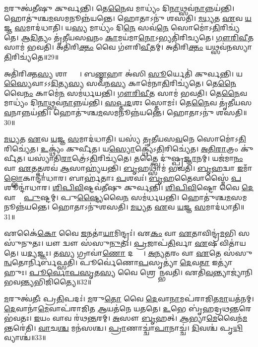 \ul{𑌮}𑌰𑍁𑌤𑍍𑌵॑𑌤𑍀𑌷𑍁 𑌕𑍁𑌰𑍍𑌵𑌨𑍍𑌤𑌿।
𑌤𑍇\ul{𑌨𑍈}𑌵 𑌮𑌾𑌧𑍍𑌯𑌂॑ 𑌦𑌿\ul{𑌨𑌾}𑌥𑍍𑌸𑌵॑\ul{𑌨𑌾}𑌨𑍍𑌨𑌯॑𑌨𑍍𑌤𑌿।
𑌹𑍋𑌤𑍁॑𑌶𑍍𑌚\ul{𑌮}𑌸𑌮𑌨𑍂𑌨𑍍𑌨॑𑌯𑌨𑍍𑌤𑍇।
𑌹𑍋𑌤𑌾𑌽𑌨𑍁॑ 𑌶𑌸𑌤𑌿।
\ul{𑌮}\ul{𑌧𑍍𑌯}𑌤 \ul{𑌏}𑌵 \ul{𑌯}𑌜𑍍𑌞 \ul{𑌸}𑌮𑌾𑌦॑𑌧𑌾𑌤𑌿।
𑌯\ul{𑌸𑍍𑌯} 𑌮𑌾𑌧𑍍𑌯𑌂॑ 𑌦𑌿\ul{𑌨𑍇} 𑌸𑌵॑\ul{𑌨𑍇} 𑌸𑍋𑌮𑍋॑\-𑌽\ul{𑌤𑌿}𑌰𑌿𑌚𑍍𑌯॑𑌤𑍇।
\ul{𑌆}\ul{𑌦𑌿}𑌤𑍍𑌯𑌂 𑌤𑍃॑𑌤𑍀𑌯𑌸\ul{𑌵}𑌨𑌂 \ul{𑌕𑌾}𑌮𑌯॑𑌮𑌾\ul{𑌨𑍋}\-𑌽𑌭𑍍𑌯𑌤𑌿॑𑌰𑌿𑌚𑍍𑌯𑌤𑍇।
\ul{𑌗𑍗}\ul{𑌰𑌿}\ul{𑌵𑍀}𑌤 𑌸𑌾𑌮॑ 𑌭𑌵𑌤𑌿।
𑌅𑌤𑌿॑𑌰𑌿\ul{𑌕𑍍𑌤𑌂} 𑌵𑍈 𑌗𑍗॑𑌰𑌿\ul{𑌵𑍀}𑌤𑌮𑍍।
𑌅𑌤𑌿॑𑌰𑌿\ul{𑌕𑍍𑌤𑌂} 𑌯𑌥𑍍𑌸𑌵॑𑌨𑌸𑍍𑌯𑌾\ul{𑌤𑌿}𑌰𑌿𑌚𑍍𑌯॑𑌤𑍇॥29॥

𑌅𑌤𑌿॑𑌰𑌿𑌕𑍍𑌤\ul{𑌸𑍍𑌯} 𑌶𑌾𑌨𑍍𑌤𑍍𑌯𑍈᳚।
𑌬\ul{𑌣𑍍𑌮}𑌹𑌾 𑌅॑𑌸𑌿 \ul{𑌸𑍂}𑌰𑍍𑌯𑍇𑌤𑌿॑ 𑌕𑍁𑌰𑍍𑌵𑌨𑍍𑌤𑌿।
𑌯\ul{𑌸𑍍𑌯𑍈}𑌵𑌾\-𑌽𑌽\ul{𑌦𑌿}𑌤𑍍𑌯\ul{𑌸𑍍𑌯} 𑌸𑌵॑𑌨\ul{𑌸𑍍𑌯} 𑌕𑌾𑌮𑍇॑𑌨𑌾\ul{𑌤𑌿}𑌰𑌿𑌚𑍍𑌯॑𑌤𑍇।
𑌤𑍇\ul{𑌨𑍈}𑌵𑍈\ul{𑌨𑌂} 𑌕𑌾𑌮𑍇॑\ul{𑌨} 𑌸𑌮॑𑌰𑍍𑌧𑌯𑌨𑍍𑌤𑌿।
\ul{𑌗𑍗}\ul{𑌰𑌿}\ul{𑌵𑍀}𑌤 𑌸𑌾𑌮॑ 𑌭𑌵𑌤𑌿।
𑌤𑍇\ul{𑌨𑍈}𑌵 𑌮𑌾𑌧𑍍𑌯𑌂॑ 𑌦𑌿\ul{𑌨𑌾}𑌥𑍍𑌸𑌵॑\ul{𑌨𑌾}𑌨𑍍𑌨𑌯॑𑌨𑍍𑌤𑌿।
\ul{𑌸}\ul{𑌪𑍍𑌤}\ul{𑌦}𑌶𑌃 𑌸𑍍𑌤𑍋𑌮𑌃॑।
𑌤𑍇\ul{𑌨𑍈}𑌵 𑌤𑍃॑𑌤𑍀𑌯𑌸\ul{𑌵}𑌨𑌾𑌨𑍍𑌨𑌯॑𑌨𑍍𑌤𑌿।
𑌹𑍋𑌤𑍁॑𑌶𑍍𑌚\ul{𑌮}𑌸𑌮𑌨𑍂𑌨𑍍𑌨॑𑌯𑌨𑍍𑌤𑍇।
𑌹𑍋𑌤𑌾𑌽𑌨𑍁॑ 𑌶𑌸𑌤𑌿॥30॥

\ul{𑌮}\ul{𑌧𑍍𑌯}𑌤 \ul{𑌏}𑌵 \ul{𑌯}𑌜𑍍𑌞 \ul{𑌸}𑌮𑌾𑌦॑𑌧𑌾𑌤𑌿।
𑌯𑌸𑍍𑌯॑ 𑌤𑍃𑌤𑍀𑌯𑌸\ul{𑌵}𑌨𑍇 𑌸𑍋𑌮𑍋॑\-𑌽\ul{𑌤𑌿}𑌰𑌿𑌚𑍍𑌯𑍇॑𑌤।
\ul{𑌉}𑌕𑍍𑌥𑍍𑌯𑌂॑ 𑌕𑍁𑌰𑍍𑌵𑍀𑌤।
𑌯\ul{𑌸𑍍𑌯𑍋}𑌕𑍍𑌥𑍍𑌯𑍇॑\-𑌽\ul{𑌤𑌿}𑌰𑌿𑌚𑍍𑌯𑍇॑𑌤।
\ul{𑌅}\ul{𑌤𑌿}\ul{𑌰𑌾}𑌤𑍍𑌰𑌂 𑌕𑍁॑𑌰𑍍𑌵𑍀𑌤।
𑌯𑌸𑍍𑌯𑌾॑𑌤𑌿\ul{𑌰𑌾}𑌤𑍍𑌰𑍇॑\-𑌽\ul{𑌤𑌿}𑌰𑌿𑌚𑍍𑌯॑𑌤𑍇।
𑌤𑌤𑍍𑌤𑍍𑌵𑍈 𑌦𑍁॑𑌷𑍍𑌪𑍍𑌰\ul{𑌜𑍍𑌞𑌾}𑌨𑌮𑍍।
𑌯𑌜॑𑌮𑌾\ul{𑌨𑌂} 𑌵𑌾 \ul{𑌏}𑌤\ul{𑌤𑍍𑌪}𑌶𑌵॑ \ul{𑌆}𑌸𑌾𑌹𑍍𑌯॑𑌯𑌨𑍍𑌤𑌿।
\ul{𑌬𑍃}𑌹𑌥𑍍𑌸𑌾𑌮॑ 𑌭𑌵𑌤𑌿।
\ul{𑌬𑍃}𑌹𑌦𑍍𑌵𑌾 \ul{𑌇}𑌮𑌾𑌁\ul{𑌲𑍍𑌲𑍋}𑌕𑌾𑌨𑍍𑌦𑌾॑𑌧𑌾𑌰।
𑌬𑌾𑌰𑍍\mbox{}𑌹॑𑌤𑌾𑌃 \ul{𑌪}𑌶𑌵𑌃॑।
\ul{𑌬𑍃}\ul{𑌹}𑌤𑍈𑌵𑌾𑌸𑍍𑌮𑍈॑ \ul{𑌪}𑌶𑍂𑌨𑍍𑌦𑌾॑𑌧𑌾𑌰।
\ul{𑌶𑌿}\ul{𑌪𑌿}\ul{𑌵𑌿}𑌷𑍍𑌟𑌵॑𑌤𑍀𑌷𑍁 𑌕𑍁𑌰𑍍𑌵𑌨𑍍𑌤𑌿।
\ul{𑌶𑌿}\ul{𑌪𑌿}\ul{𑌵𑌿}𑌷𑍍𑌟𑍋 𑌵𑍈 \ul{𑌦𑍇}𑌵𑌾𑌨𑌾𑌂᳚ \ul{𑌪𑍁}𑌷𑍍𑌟𑌮𑍍।
𑌪𑍁\ul{𑌷𑍍𑌟𑍍𑌯𑍈}𑌵𑍈\ul{𑌨}\ul{} 𑌸𑌮॑𑌰𑍍𑌧𑌯𑌨𑍍𑌤𑌿।
𑌹𑍋𑌤𑍁॑𑌶𑍍𑌚\ul{𑌮}𑌸𑌮𑌨𑍂𑌨𑍍𑌨॑𑌯𑌨𑍍𑌤𑍇।
𑌹𑍋𑌤𑌾𑌽𑌨𑍁॑𑌶𑌸𑌤𑌿।
\ul{𑌮}\ul{𑌧𑍍𑌯}𑌤 \ul{𑌏}𑌵 \ul{𑌯}𑌜𑍍𑌞 \ul{𑌸}𑌮𑌾𑌦॑𑌧𑌾𑌤𑌿॥31॥\anuvakamend[\ul{𑌯}\ul{𑌨𑍍𑌤𑌿} 𑌸𑌵॑𑌨𑌸𑍍𑌯𑌾\ul{𑌤𑌿}𑌰𑌿𑌚𑍍𑌯॑𑌤𑍇 𑌶\dng{ꣳ}𑌸𑌤𑌿 𑌦𑌾𑌧𑌾\ul{𑌰𑌾}𑌷𑍍𑌟𑍗 𑌚॑]

𑌏𑌕𑍈॑\ul{𑌕𑍋} 𑌵𑍈 \ul{𑌜}𑌨𑌤𑌾॑\ul{𑌯𑌾}𑌮𑌿𑌨𑍍𑌦𑍍𑌰𑌃॑।
𑌏\ul{𑌕𑌂} 𑌵𑌾 \ul{𑌏}𑌤𑌾𑌵𑌿𑌨𑍍𑌦𑍍𑌰॑\ul{𑌮}𑌭𑌿 𑌸𑌸𑍁॑𑌨𑍁𑌤𑌃।
𑌯𑍗 𑌦𑍍𑌵𑍗 𑌸॑𑌸𑍁\ul{𑌨𑍁}𑌤𑌃।
\ul{𑌪𑍍𑌰}𑌜𑌾𑌪॑\ul{𑌤𑌿}𑌰𑍍𑌵𑌾 \ul{𑌏}𑌷 𑌵𑌿𑌤𑌾॑𑌯𑌤𑍇।
𑌯\ul{𑌦𑍍𑌯}𑌜𑍍𑌞𑌃।
𑌤\ul{𑌸𑍍𑌯} 𑌗𑍍𑌰𑌾𑌵𑌾॑\ul{𑌣𑍋} 𑌦𑌨𑍍𑌤𑌾𑌃᳚।
\ul{𑌅}\ul{𑌨𑍍𑌯}\ul{𑌤}𑌰𑌂 𑌵𑌾 \ul{𑌏}𑌤𑍇 𑌸॑𑌸𑍁\ul{𑌨𑍍𑌵}𑌤𑍋𑌰𑍍𑌨𑌿𑌰𑍍𑌬॑𑌫𑍍𑌸𑌤𑌿।
𑌪𑍂𑌰𑍍𑌵𑍇॑𑌣𑍋\ul{𑌪}𑌸𑍃𑌤𑍍𑌯𑌾॑ \ul{𑌦𑍇}𑌵\ul{𑌤𑌾} 𑌇𑌤𑍍𑌯𑌾॑𑌹𑍁𑌃।
\ul{𑌪𑍂}\ul{𑌰𑍍𑌵𑍋}\ul{𑌪}\ul{𑌸𑍃}𑌤\ul{𑌸𑍍𑌯} 𑌵𑍈 𑌶𑍍𑌰𑍇𑌯𑌾᳚𑌨𑍍𑌭𑌵𑌤𑌿।
𑌏𑌤𑌿॑\ul{𑌵}𑌨𑍍𑌤𑍍𑌯𑌾𑌜𑍍𑌯𑌾॑𑌨𑌿 𑌭𑌵\ul{𑌨𑍍𑌤𑍍𑌯}𑌭𑌿𑌜𑌿॑𑌤𑍍𑌯𑍈॥32॥

\ul{𑌮}𑌰𑍁𑌤𑍍𑌵॑𑌤𑍀𑌃 𑌪𑍍𑌰\ul{𑌤𑌿}𑌪𑌦𑌃॑।
\ul{𑌮}𑌰𑍁\ul{𑌤𑍋} 𑌵𑍈 \ul{𑌦𑍇}𑌵𑌾\ul{𑌨𑌾}𑌮𑌪॑𑌰𑌾𑌜𑌿𑌤\ul{𑌮𑌾}𑌯𑌤॑𑌨𑌮𑍍।
\ul{𑌦𑍇}𑌵𑌾𑌨𑌾॑\ul{𑌮𑍇}𑌵𑌾𑌪॑𑌰𑌾𑌜𑌿𑌤 \ul{𑌆}𑌯𑌤॑𑌨𑍇 𑌯𑌤𑌤𑍇।
\ul{𑌉}𑌭𑍇 𑌬𑍃॑𑌹𑌦𑍍𑌰𑌥\ul{𑌨𑍍𑌤}𑌰𑍇 𑌭॑𑌵𑌤𑌃।
\ul{𑌇}𑌯𑌂 𑌵𑌾𑌵 𑌰॑𑌥\ul{𑌨𑍍𑌤}𑌰𑌮𑍍।
\ul{𑌅}𑌸𑍗 \ul{𑌬𑍃}𑌹𑌤𑍍।
\ul{𑌆}𑌭𑍍𑌯𑌾\ul{𑌮𑍇}𑌵𑍈𑌨॑\ul{𑌮}𑌨𑍍𑌤𑌰𑍇॑𑌤𑌿।
\ul{𑌵𑌾}𑌚\ul{𑌶𑍍𑌚} 𑌮𑌨॑𑌸𑌶𑍍𑌚।
\ul{𑌪𑍍𑌰𑌾}𑌣𑌾𑌚𑍍𑌚𑌾॑\ul{𑌪𑌾}𑌨𑌾𑌚𑍍𑌚॑।
\ul{𑌦𑌿}𑌵𑌶𑍍𑌚॑ 𑌪𑍃\ul{𑌥𑌿}𑌵𑍍𑌯𑌾𑌶𑍍𑌚॑॥33॥

